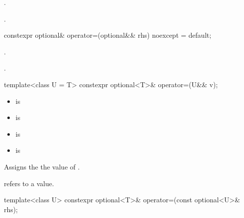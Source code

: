   \begin{itemdescr}
    \pnum
    \ensures
    .

    \pnum
    \returns
    .

  \end{itemdescr}

  \begin{itemdecl}
    constexpr optional& operator=(optional&& rhs) noexcept = default;
  \end{itemdecl}

  \begin{itemdescr}
    \pnum
    \ensures
    .

    \pnum
    \returns
    .
  \end{itemdescr}

  \begin{itemdecl}
    template<class U = T> constexpr optional<T>& operator=(U&& v);
  \end{itemdecl}

  \begin{itemdescr}
    \pnum
    \constraints
    \begin{itemize}
    \item {} is 
    \item {} is 
    \end{itemize}

    \pnum
    \mandates
    \begin{itemize}
    \item {} is 
    \item {} is 
    \end{itemize}

    \pnum
    \effects
    Assigns the  the value of .

    \pnum
    \ensures
     refers to a value.

  \end{itemdescr}

  \begin{itemdecl}
    template<class U> constexpr optional<T>& operator=(const optional<U>& rhs);
  \end{itemdecl}

